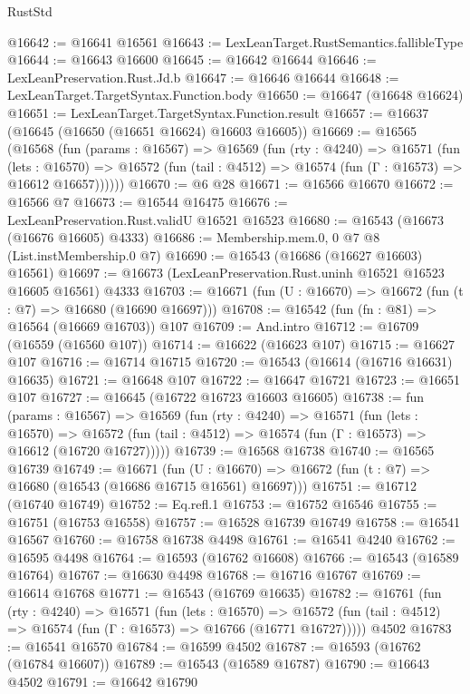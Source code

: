 \begin{lexlean}{RustStd}
\begin{coremodule}
@16642 := @16641 @16561
@16643 := LexLeanTarget.RustSemantics.fallibleType
@16644 := @16643 @16600
@16645 := @16642 @16644
@16646 := LexLeanPreservation.Rust.Jd.b
@16647 := @16646 @16644
@16648 := LexLeanTarget.TargetSyntax.Function.body
@16650 := @16647 (@16648 @16624)
@16651 := LexLeanTarget.TargetSyntax.Function.result
@16657 := @16637 (@16645 (@16650 (@16651 @16624) @16603 @16605))
@16669 := @16565
    (@16568
      (fun (params : @16567) =>
      @16569
        (fun (rty : @4240) =>
        @16571
          (fun (lets : @16570) =>
          @16572 (fun (tail : @4512) => @16574 (fun (Γ : @16573) => @16612 @16657))))))
@16670 := @6 @28
@16671 := @16566 @16670
@16672 := @16566 @7
@16673 := @16544 @16475
@16676 := LexLeanPreservation.Rust.validU @16521 @16523
@16680 := @16543 (@16673 (@16676 @16605) @4333)
@16686 := Membership.mem.{0, 0} @7 @8 (List.instMembership.{0} @7)
@16690 := @16543 (@16686 (@16627 @16603) @16561)
@16697 := @16673 (LexLeanPreservation.Rust.uninh @16521 @16523 @16605 @16561) @4333
@16703 := @16671 (fun (U : @16670) => @16672 (fun (t : @7) => @16680 (@16690 @16697)))
@16708 := @16542 (fun (fn : @81) => @16564 (@16669 @16703)) @107
@16709 := And.intro
@16712 := @16709 (@16559 (@16560 @107))
@16714 := @16622 (@16623 @107)
@16715 := @16627 @107
@16716 := @16714 @16715
@16720 := @16543 (@16614 (@16716 @16631) @16635)
@16721 := @16648 @107
@16722 := @16647 @16721
@16723 := @16651 @107
@16727 := @16645 (@16722 @16723 @16603 @16605)
@16738 := fun (params : @16567) =>
  @16569
    (fun (rty : @4240) =>
    @16571
      (fun (lets : @16570) =>
      @16572 (fun (tail : @4512) => @16574 (fun (Γ : @16573) => @16612 (@16720 @16727)))))
@16739 := @16568 @16738
@16740 := @16565 @16739
@16749 := @16671
    (fun (U : @16670) => @16672 (fun (t : @7) => @16680 (@16543 (@16686 @16715 @16561) @16697)))
@16751 := @16712 (@16740 @16749)
@16752 := Eq.refl.{1}
@16753 := @16752 @16546
@16755 := @16751 (@16753 @16558)
@16757 := @16528 @16739 @16749
@16758 := @16541 @16567
@16760 := @16758 @16738 @4498
@16761 := @16541 @4240
@16762 := @16595 @4498
@16764 := @16593 (@16762 @16608)
@16766 := @16543 (@16589 @16764)
@16767 := @16630 @4498
@16768 := @16716 @16767
@16769 := @16614 @16768
@16771 := @16543 (@16769 @16635)
@16782 := @16761
    (fun (rty : @4240) =>
    @16571
      (fun (lets : @16570) =>
      @16572 (fun (tail : @4512) => @16574 (fun (Γ : @16573) => @16766 (@16771 @16727)))))
    @4502
@16783 := @16541 @16570
@16784 := @16599 @4502
@16787 := @16593 (@16762 (@16784 @16607))
@16789 := @16543 (@16589 @16787)
@16790 := @16643 @4502
@16791 := @16642 @16790

\end{coremodule}
\end{lexlean}

